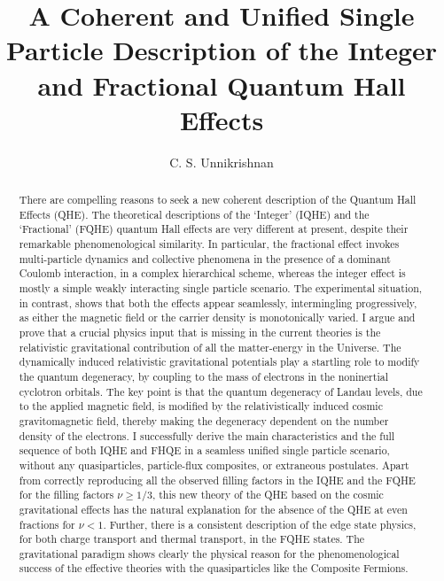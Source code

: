 \documentclass[aps,preprint,12pt,tightenlines]{revtex4}%
\begin{document}
\preprint{ }
\title[ ]{A Coherent and Unified Single Particle Description of the Integer and Fractional Quantum Hall Effects}
\author{C. S. Unnikrishnan}

\begin{abstract}
There are compelling reasons to seek a new coherent description of the Quantum
Hall Effects (QHE). The theoretical descriptions of the `Integer' (IQHE) and
the `Fractional' (FQHE) quantum Hall effects are very different at present,
despite their remarkable phenomenological similarity. In particular, the
fractional effect invokes multi-particle dynamics and collective phenomena in the presence of a dominant
Coulomb interaction, in a complex hierarchical scheme, whereas the integer
effect is mostly a simple weakly interacting single particle scenario. The
experimental situation, in contrast, shows that both the effects
appear seamlessly, intermingling progressively, as either the magnetic field
or the carrier density is monotonically varied. I argue and prove that a
crucial physics input that is missing in the current theories is the relativistic 
gravitational contribution of all the matter-energy in the Universe. The dynamically induced
relativistic gravitational potentials play a startling role to modify the quantum degeneracy, by coupling to the mass of electrons in the noninertial cyclotron orbitals.
The key point is that the quantum degeneracy of Landau levels, due to the applied magnetic field,
is modified by the relativistically induced cosmic gravitomagnetic field, thereby
making the degeneracy dependent on the number density of the
electrons. I successfully derive the main characteristics and the full
sequence of both IQHE and FHQE in a seamless unified single particle scenario,
without any quasiparticles, particle-flux composites, or extraneous postulates. Apart from correctly
reproducing all the observed filling factors in the IQHE and the FQHE for the
filling factors $\nu\geq1/3$, this new theory of the QHE based on the cosmic
gravitational effects has the natural explanation for the absence of the QHE
at even fractions for $\nu<1$. Further, there is a consistent description of the
edge state physics, for both charge transport and thermal transport, in the
FQHE states. The gravitational paradigm shows clearly the physical reason for
the phenomenological success of the effective theories with the quasiparticles
like the Composite Fermions.

\end{abstract}
\maketitle
\tableofcontents
\end{document}
